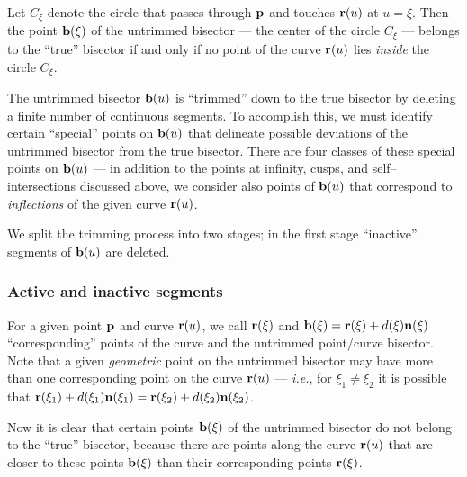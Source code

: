\begin{rmk} \label{rmk:bis} {\rm
Let $C_\xi$ denote the circle that passes through ${\bf p}$ and
touches ${\bf r}(u)$ at $u=\xi$. Then the point ${\bf b}(\xi)$ of
the untrimmed bisector --- the center of the circle $C_\xi$ ---
belongs to the ``true'' bisector if and only if no point of the
curve ${\bf r}(u)$ lies {\it inside\/} the circle $C_\xi$. }
\end{rmk}

The untrimmed bisector ${\bf b}(u)$ is ``trimmed'' down to the
true bisector by deleting a finite number of continuous segments.
To accomplish this, we must identify certain ``special'' points on
${\bf b}(u)$ that delineate possible deviations of the untrimmed
bisector from the true bisector. There are four classes of these
special points on ${\bf b}(u)$ --- in addition to the points at
infinity, cusps, and self--intersections discussed above, we
consider also points of ${\bf b}(u)$ that correspond to {\it
inflections\/} of the given curve ${\bf r}(u)$.

We split the trimming process into two stages; in the first
stage ``inactive'' segments of ${\bf b}(u)$ are deleted.

\subsubsection{Active and inactive segments}

For a given point ${\bf p}$ and curve ${\bf r}(u)$, we call
${\bf r}(\xi)$ and ${\bf b}(\xi)={\bf r}(\xi)+d(\xi){\bf n}(\xi)$
``corresponding'' points of the curve and the untrimmed point/curve
bisector. Note that a given {\it geometric\/} point on the untrimmed
bisector may have more than one corresponding point on the curve
${\bf r}(u)$ --- {\it i.e.}, for $\xi_1\not=\xi_2$ it is possible
that ${\bf r}(\xi_1)+d(\xi_1){\bf n}(\xi_1)={\bf r}(\xi_2)+d(\xi_2)
{\bf n}(\xi_2)$.

Now it is clear that certain points ${\bf b}(\xi)$ of the untrimmed
bisector do not belong to the ``true'' bisector, because there are
points along the curve ${\bf r}(u)$ that are closer to these points
${\bf b}(\xi)$ than their corresponding points ${\bf r}(\xi)$.


